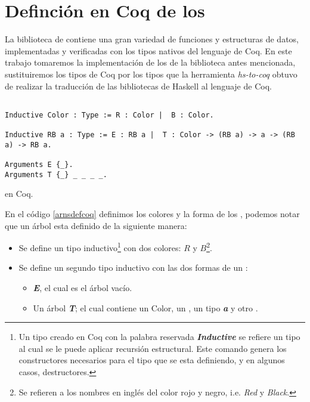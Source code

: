 \section{Definci\'on en Coq de los {\arns}}

La biblioteca de {\coq} contiene una gran variedad de funciones y estructuras de datos, 
implementadas y verificadas con los tipos nativos del lenguaje de Coq. En este trabajo
tomaremos la implementaci\'on de los {\arns} de la biblioteca antes mencionada, 
sustituiremos los tipos de Coq por los tipos que la herramienta \textit{hs-to-coq} obtuvo
de realizar la traducci\'on de las bibliotecas de Haskell al lenguaje de Coq.

\begin{listing}[!ht]
\centering
\captionsetup{justification=centering}
\begin{verbatim}

Inductive Color : Type := R : Color |  B : Color.

Inductive RB a : Type := E : RB a |  T : Color -> (RB a) -> a -> (RB a) -> RB a.

Arguments E {_}.
Arguments T {_} _ _ _ _.
\end{verbatim}
\caption{{\Arns} en Coq.}
\label{arnsdefcoq}
\end{listing}

En el c\'odigo \ref{arnsdefcoq} definimos los colores y la forma de los {\arns}, podemos notar que un \'arbol esta definido de la siguiente manera:
\begin{itemize}
    \item Se define un tipo inductivo\footnote{Un tipo creado en Coq con la palabra reservada \textit{\textbf{Inductive}} se refiere un tipo al cual se le puede aplicar recursi\'on estructural. Este comando genera los constructores necesarios para el tipo que se esta definiendo, y en algunos casos, destructores.\cite{IndAndRec}} con dos colores: $R$ y $B$\footnote{Se refieren a los nombres en ingl\'es del color rojo y negro, i.e. \textit{Red} y \textit{Black}.}.
    \item Se define un segundo tipo inductivo con las dos formas de un {\arn}:
    \begin{itemize}
        \item \textit{\textbf{E}}, el cual es el \'arbol vacío.
        \item Un \'arbol \textit{\textbf{T}}; el cual contiene un Color, un {\arn}, un tipo \textit{\textbf{a}} y otro {\arn}.
    \end{itemize}
\end{itemize}

